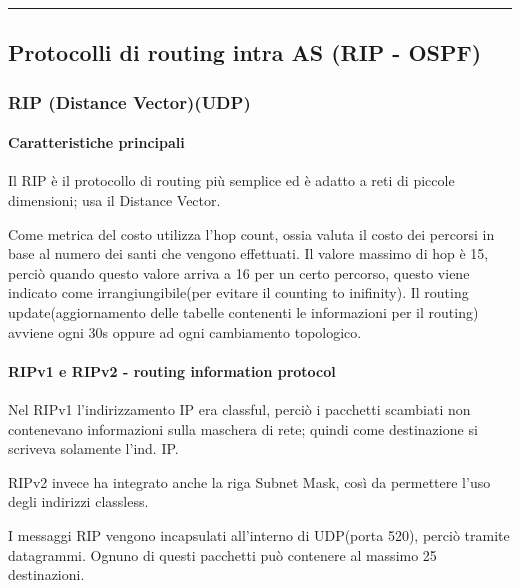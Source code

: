 \vspace{0.5em}
\noindent\rule{\linewidth}{0.4pt}
\vspace{0.5em}

\subsection{Protocolli di routing intra AS (RIP - OSPF)}
\subsubsection{RIP (Distance Vector)(UDP)}
\paragraph{Caratteristiche principali}
Il RIP è il protocollo di routing più semplice ed è adatto a reti di piccole dimensioni; usa il Distance Vector.

Come metrica del costo utilizza l'hop count, ossia valuta il costo dei percorsi in base al numero dei santi che vengono effettuati.
Il valore massimo di hop è 15, perciò quando questo valore arriva a 16 per un certo percorso, questo viene indicato come irrangiungibile(per evitare il counting to inifinity).
Il routing update(aggiornamento delle tabelle contenenti le informazioni per il routing) avviene ogni 30s oppure ad ogni cambiamento topologico.

\newpage


\paragraph{RIPv1 e RIPv2 - routing information protocol}

 Nel RIPv1 l'indirizzamento IP era classful, perciò i pacchetti scambiati non contenevano informazioni sulla maschera di rete; quindi come destinazione si scriveva solamente l'ind. IP.

 RIPv2 invece ha integrato anche la riga Subnet Mask, così da permettere l'uso degli indirizzi classless. 

 I messaggi RIP vengono incapsulati all'interno di UDP(porta 520), perciò tramite datagrammi. Ognuno di questi pacchetti può contenere al massimo 25 destinazioni.

